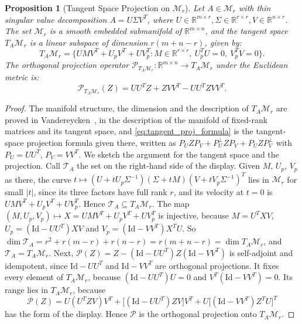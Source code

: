\documentclass[11pt,a4paper,reqno]{amsart}
\newtheorem{proposition}[theorem]{Proposition}
\theoremstyle{definition}
\numberwithin{equation}{section}
\providecommand{\R}{\mathbb{R}}
\newcommand{\Id}{\mathrm{Id}}
\providecommand{\R}{\mathbb{R}}
\begin{document}
\begin{proposition}[Tangent Space Projection on $\mathcal{M}_r$]
\label{prop:tangent_proj_mr}
Let $A \in \mathcal{M}_r$ with thin singular value decomposition $A = U \Sigma V^T$, where $U \in \R^{m \times r}, \Sigma \in \R^{r \times r}, V \in \R^{n \times r}$. The set $\mathcal{M}_r$ is a smooth embedded submanifold of $\R^{m \times n}$, and the tangent space $T_A \mathcal{M}_r$ is a linear subspace of dimension $r(m + n - r)$, given by:
\begin{equation}
    T_A \mathcal{M}_r = \{ U M V^T + U_p V^T + U V_p^T \colon M \in \R^{r \times r}, \ U_p^T U = 0, \ V_p^T V = 0 \}.
\end{equation}
The orthogonal projection operator $\mathcal{P}_{T_A \mathcal{M}_r} \colon \R^{m \times n} \to T_A \mathcal{M}_r$ under the Euclidean metric is:
\begin{equation}
    \label{eq:tangent_proj_formula}
    \mathcal{P}_{T_A \mathcal{M}_r}(Z) = U U^T Z + Z V V^T - U U^T Z V V^T.
\end{equation}
\end{proposition}
\begin{proof}
The manifold structure, the dimension and the description of $T_A\mathcal{M}_r$ are proved in Vandereycken~\cite{vandereycken2013lowrank}, in the description of the manifold of fixed-rank matrices and its tangent space, and \eqref{eq:tangent_proj_formula} is the tangent-space projection formula given there, written as $P_U Z P_V + P_U^{\perp} Z P_V + P_U Z P_V^{\perp}$ with $P_U = UU^T$, $P_V = VV^T$. We sketch the argument for the tangent space and the projection. Call $\mathcal{T}_A$ the set on the right-hand side of the display. Given $M$, $U_p$, $V_p$ as there, the curve $t \mapsto (U + tU_p\Sigma^{-1})(\Sigma + tM)(V + tV_p\Sigma^{-1})^T$ lies in $\mathcal{M}_r$ for small $|t|$, since its three factors have full rank $r$, and its velocity at $t = 0$ is $UMV^T + U_pV^T + UV_p^T$. Hence $\mathcal{T}_A \subseteq T_A\mathcal{M}_r$. The map $(M, U_p, V_p) \mapsto X = UMV^T + U_pV^T + UV_p^T$ is injective, because $M = U^TXV$, $U_p = (\Id - UU^T)XV$ and $V_p = (\Id - VV^T)X^TU$. So $\dim\mathcal{T}_A = r^2 + r(m-r) + r(n-r) = r(m+n-r) = \dim T_A\mathcal{M}_r$, and $\mathcal{T}_A = T_A\mathcal{M}_r$. Next, $\mathcal{P}(Z) = Z - (\Id - UU^T)Z(\Id - VV^T)$ is self-adjoint and idempotent, since $\Id - UU^T$ and $\Id - VV^T$ are orthogonal projections. It fixes every element of $T_A\mathcal{M}_r$, because $(\Id - UU^T)U = 0$ and $V^T(\Id - VV^T) = 0$. Its range lies in $T_A\mathcal{M}_r$, because
\begin{equation*}
    \mathcal{P}(Z) = U(U^TZV)V^T + \big[(\Id - UU^T)ZV\big]V^T + U\big[(\Id - VV^T)Z^TU\big]^T
\end{equation*}
has the form of the display. Hence $\mathcal{P}$ is the orthogonal projection onto $T_A\mathcal{M}_r$.
\end{proof}
\end{document}
